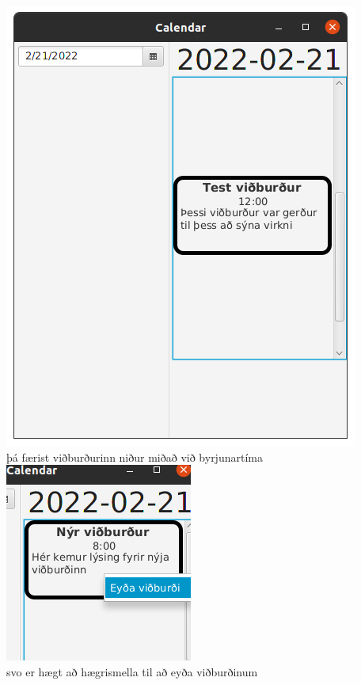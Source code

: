 \documentclass{article}
\begin{document}
\begin{center}
    \includegraphics[scale=0.3]{imgs/s11.png}\\
    þá færist viðburðurinn niður miðað við byrjunartíma\\
    \includegraphics[scale=0.3]{imgs/s12.png}\\
    svo er hægt að hægrismella til að eyða viðburðinum\\

\end{center}
\end{document}
